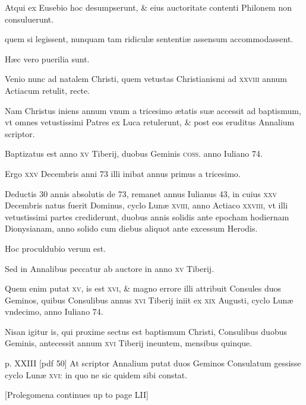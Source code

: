 \begin{parnumbers}
Atqui ex Eusebio
hoc desumpserunt, \& eius auctoritate contenti Philonem non consuluerunt.

quem si legissent, nunquam tam ridiculæ sententiæ assensum
accommodassent.

Hæc vero puerilia sunt.

Venio nunc ad natalem
Christi, quem vetustas Christianismi ad \textsc{xxviii} annum Actiacum
retulit, recte.

Nam Christus iniens annum vnum a tricesimo
ætatis suæ accessit ad baptismum, vt omnes vetustissimi Patres ex
Luca retulerunt, \& post eos eruditus Annalium scriptor.

Baptizatus est anno \textsc{xv} Tiberij, duobus Geminis \textsc{coss}. anno
Iuliano 74.

Ergo \textsc{xxv} Decembris anni 73 illi inibat annus primus a tricesimo.

Deductis 30 annis absolutis de 73, remanet annus Iulianus
43, in cuius \textsc{xxv} Decembris natus fuerit Dominus, cyclo Lunæ
\textsc{xviii}, anno Actiaco \textsc{xxviii},
 vt illi vetustissimi partes crediderunt,
duobus annis solidis ante epocham hodiernam Dionysianam,
anno solido cum diebus aliquot ante excessum Herodis.

Hoc proculdubio
verum est.

Sed in Annalibus peccatur ab auctore in anno
\textsc{xv} Tiberij.

Quem enim putat \textsc{xv}, is est \textsc{xvi}, \& magno errore illi
attribuit Consules duos Geminos, quibus Consulibus annus \textsc{xvi}
Tiberij iniit ex \textsc{xix} Augusti, cyclo Lunæ vndecimo, anno Iuliano
74.

Nisan igitur is, qui proxime sectus est baptismum Christi,
Consulibus duobus Geminis, antecessit annum \textsc{xvi} Tiberij ineuntem,
mensibus quinque.

\clearpage
p. XXIII [pdf 50]
At scriptor Annalium putat duos Geminos
Consulatum gessisse cyclo Lunæ \textsc{xvi}: in quo ne sic quidem
sibi constat.

[Prolegomena continues up to page LII]

\end{parnumbers}
